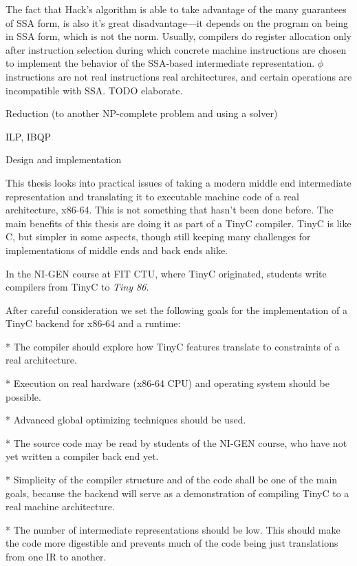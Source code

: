 The fact that Hack's algorithm is able to take advantage of the many guarantees
of SSA form, is also it's great disadvantage---it depends on the program on
being in SSA form, which is not the norm. Usually, compilers do register
allocation only after instruction selection during which concrete machine
instructions are chosen to implement the behavior of the SSA-based intermediate
representation. $\phi$ instructions are not real instructions real
architectures, and certain operations are incompatible with SSA. TODO elaborate.

\seccc Reduction (to another NP-complete problem and using a solver)

ILP, IBQP

\chap Design and implementation

This thesis looks into practical issues of taking a modern middle end
intermediate representation and translating it to executable machine code of a
real architecture, x86-64. This is not something that hasn't been done before.
The main benefits of this thesis are doing it as part of a TinyC compiler. TinyC
is like C, but simpler in some aspects, though still keeping many challenges for
implementations of middle ends and back ends alike.

In the NI-GEN course at FIT CTU, where TinyC originated, students write
compilers from TinyC to {\em Tiny 86}.

After careful consideration we set the following goals for the implementation of
a TinyC backend for x86-64 and a runtime:

\begitems

* The compiler should explore how TinyC features translate to constraints of a
real architecture.

* Execution on real hardware (x86-64 CPU) and operating system should be
possible.

* Advanced global optimizing techniques should be used.

* The source code may be read by students of the NI-GEN course, who have not yet
written a compiler back end yet.

* Simplicity of the compiler structure and of the code shall be one of the main
goals, because the backend will serve as a demonstration of compiling TinyC to a
real machine architecture.

* The number of intermediate representations should be low. This should make the
code more digestible and prevents much of the code being just translations from
one IR to another.

